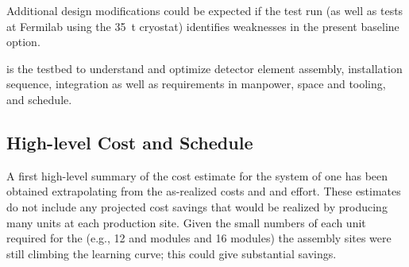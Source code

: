 Additional design modifications could be expected if the  test run (as well as tests at Fermilab using the \SI{35}{\tonne} cryostat) identifies weaknesses in the present baseline option.


 is the testbed to understand and optimize detector element assembly, installation sequence, integration as well as requirements in manpower, space and tooling, and schedule. 



%
%
%
\subsection{High-level Cost and Schedule}
\label{sec:fdsp-hv-org-cs}

A first high-level summary of the cost estimate for the  system of one  has been obtained extrapolating from the as-realized  costs and and effort. These estimates do not include any projected cost savings that would be realized by producing many units at each production site. Given the small numbers of each unit required for the  (e.g., 12  and  modules and 16  modules) the assembly sites were still climbing the learning curve; this could give substantial savings. 

